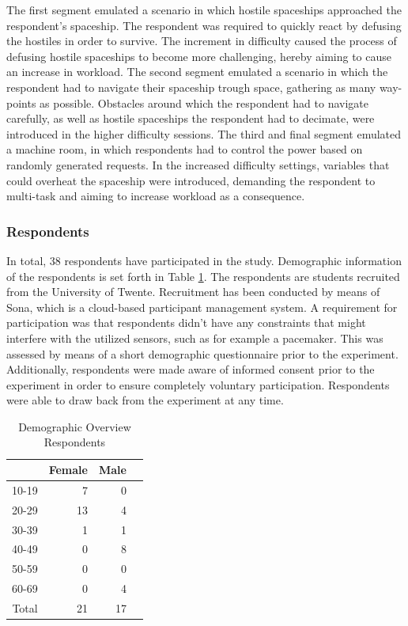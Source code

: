\documentclass[12pt]{article}
\begin{document}
The first segment emulated a scenario in which hostile spaceships approached the respondent's spaceship. The respondent was required to quickly react by defusing the hostiles in order to survive. The increment in difficulty caused the process of defusing hostile spaceships to become more challenging, hereby aiming to cause an increase in workload. The second segment emulated a scenario in which the respondent had to navigate their spaceship trough space, gathering as many way-points as possible. Obstacles around which the respondent had to navigate carefully, as well as hostile spaceships the respondent had to decimate, were introduced in the higher difficulty sessions. The third and final segment emulated a machine room, in which respondents had to control the power based on randomly generated requests. In the increased difficulty settings, variables that could overheat the spaceship were introduced, demanding the respondent to multi-task and aiming to increase workload as a consequence.

\subsubsection{Respondents}
In total, 38 respondents have participated in the study. Demographic information of the respondents is set forth in Table \ref{table:demographics}. The respondents are students recruited from the University of Twente. Recruitment has been conducted by means of Sona, which is a cloud-based participant management system. A requirement for participation was that respondents didn't have any constraints that might interfere with the utilized sensors, such as for example a pacemaker. This was assessed by means of a short demographic questionnaire prior to the experiment. Additionally, respondents were made aware of informed consent prior to the experiment in order to ensure completely voluntary participation. Respondents were able to draw back from the experiment at any time. 

\bgroup
\def\arraystretch{1.6}  
\begin{table}[h]
\bigskip
\caption{Demographic Overview Respondents}
\label{table:demographics}
\begin{tabular}{rrrr}
  \hline
 & Female & Male \\ 
  \hline
10-19 &   7 &   0 &  \hspace{1cm} \\ 
  20-29 &  13 &   4 &   \\ 
  30-39 &   1 &   1  &   \\ 
  40-49 &   0 &   8  &   \\ 
  50-59 &   0 &   0 &   \\ 
  60-69 &   0 &   4 &   \\ \hline
  Total    &  21 &  17 & \\ \hline
\end{tabular}
\end{table}
\egroup
\end{document}
